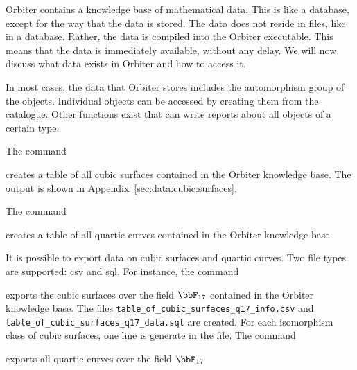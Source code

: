 Orbiter contains a knowledge base of mathematical data. 
This is like a database, except for the way that the data is stored. 
The data does not reside in files, like in a database. 
Rather, the data is compiled into the Orbiter executable. 
This means that the data is immediately available, without any delay. 
We will now discuss what data exists in Orbiter and how to access it.

\bigskip



In most cases, 
the data that Orbiter stores includes the automorphism group of the objects.
Individual objects can be accessed by creating them from the catalogue.
Other functions exist that can write reports about all objects of a certain type.


\bigskip


The command 


creates a table of all cubic surfaces contained in the Orbiter knowledge base.
The output is shown in Appendix~\ref{sec:data:cubic:surfaces}.


\bigskip

The command 


creates a table of all quartic curves contained in the Orbiter knowledge base.


\bigskip

It is possible to export data on cubic surfaces and quartic curves. 
Two file types are supported: csv and sql. 
For instance, 
the command 


exports the cubic surfaces over the field $\bbF_{17}$ 
contained in the Orbiter knowledge base.
The files 
\verb'table_of_cubic_surfaces_q17_info.csv' and 
\verb'table_of_cubic_surfaces_q17_data.sql' are created.
For each isomorphism class of cubic surfaces, one line is generate in the file.
The command 


exports all quartic curves over the field $\bbF_{17}$ 


\bigskip

